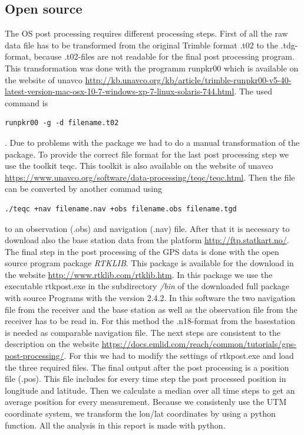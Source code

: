 \subsection{Open source}
The OS post processing requires different processing steps.
First of all the raw data file has to be transformed from the original Trimble format .t02 to the .tdg-format, because .t02-files are not readable for the final post processing program.
This transformation was done with the programm runpkr00 which is available on the website of unavco \url{http://kb.unavco.org/kb/article/trimble-runpkr00-v5-40-latest-version-mac-osx-10-7-windows-xp-7-linux-solaris-744.html}.
The used command is 
\begin{verbatim} 
runpkr00 -g -d filename.t02 
\end{verbatim}.
Due to problems with the package we had to do a manual transformation of the package.
To provide the correct file format for the last post processing step we use the toolkit teqc.
This toolkit is also available on the website of unavco \url{https://www.unavco.org/software/data-processing/teqc/teqc.html}.
Then the file can be converted by another commad using
\begin{verbatim}
./teqc +nav filename.nav +obs filename.obs filename.tgd
\end{verbatim} 
to an observation (.obs) and navigation (.nav) file.
After that it is necessary to download also the base station data from the platform \url{http://ftp.statkart.no/}.
The final step in the post processing of the GPS data is done with the open source program package \textit{RTKLIB}.
This package is available for the download in the website \url{http://www.rtklib.com/rtklib.htm}.
In this package we use the executable rtkpost.exe in the subdirectory \textit{/bin} of the downloaded full package with source Programs with the version 2.4.2.
In this software the two navigation file from the receiver and the base station as well as the observation file from the receiver has to be read in.
For this method the .n18-format from the basestation is needed as comparable navigation file.
The next steps are consistent to the description on the website \url{https://docs.emlid.com/reach/common/tutorials/gps-post-processing/}.
For this we had to modify the settings of rtkpost.exe and load the three required files. 
The final output after the post processing is a position file (.pos). 
This file includes for every time step the post processed position in longitude and latitude.
Then we calculate a median over all time steps to get an average position for every measurement.
Because we consistenly use the UTM coordinate system, we transform the lon/lat coordinates by using a python function.
All the analysis in this report is made with python.
\medskip

